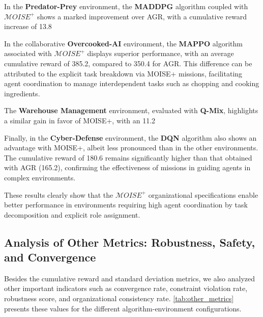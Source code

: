 \documentclass[sigconf,anonymous]{aamas}
\begin{document}
In the \textbf{Predator-Prey} environment, the \textbf{MADDPG} algorithm coupled with $\mathcal{M}OISE^+$ shows a marked improvement over AGR, with a cumulative reward increase of 13.8%

In the collaborative \textbf{Overcooked-AI} environment, the \textbf{MAPPO} algorithm associated with $\mathcal{M}OISE^+$ displays superior performance, with an average cumulative reward of 385.2, compared to 350.4 for AGR. This difference can be attributed to the explicit task breakdown via MOISE+ missions, facilitating agent coordination to manage interdependent tasks such as chopping and cooking ingredients.

The \textbf{Warehouse Management} environment, evaluated with \textbf{Q-Mix}, highlights a similar gain in favor of MOISE+, with an 11.2%

Finally, in the \textbf{Cyber-Defense} environment, the \textbf{DQN} algorithm also shows an advantage with MOISE+, albeit less pronounced than in the other environments. The cumulative reward of 180.6 remains significantly higher than that obtained with AGR (165.2), confirming the effectiveness of missions in guiding agents in complex environments.

These results clearly show that the $\mathcal{M}OISE^+$ organizational specifications enable better performance in environments requiring high agent coordination by task decomposition and explicit role assignment.

\subsection{Analysis of Other Metrics: Robustness, Safety, and Convergence}

Besides the cumulative reward and standard deviation metrics, we also analyzed other important indicators such as convergence rate, constraint violation rate, robustness score, and organizational consistency rate. \autoref{tab:other_metrics} presents these values for the different algorithm-environment configurations.
\end{document}
